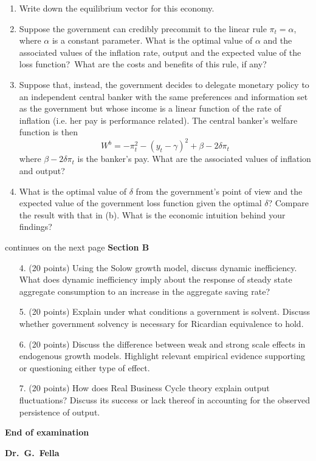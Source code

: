\documentclass[12pt,a4paper]{article}
\begin{document}
\begin{enumerate}
\begin{enumerate}
\item  Write down the equilibrium vector for this economy.
\item Suppose the government can credibly precommit to the linear rule $\pi
_{t}=\alpha $, where $\alpha $ is a constant parameter. What is the optimal
value of $\alpha $ and the associated values of the inflation rate, output
and the expected value of the loss function?\ What are the costs and
benefits of this rule, if any?

\item Suppose that, instead, the government decides to delegate
  monetary policy to an independent central banker with the same
  preferences and information set as the government but whose income
  is a linear function of the rate of inflation (i.e. her pay is
  performance related). The central banker's welfare function is then
\[
W^{b}=-\pi _{t}^{2}-(y_{t}-\gamma )^{2}+\beta-2\delta\pi _{t} 
\]
where $\beta-2\delta \pi _{t}$ is the banker's pay. What are the
associated values of inflation and output?

\item What is the optimal value of $\delta$ from the government's
  point of view and the expected value of the government loss function
  given the optimal $\delta$? Compare the result with that in (b).
  What is the economic intuition behind your findings?
\end{enumerate}
\end{enumerate}
\bigskip
\vfill \hfill continues on the next page\newpage
\textbf {Section B}
\begin{enumerate}
\item[4.] (20 points) Using the Solow growth model, discuss dynamic
  inefficiency. What does dynamic inefficiency imply about the response
  of steady state aggregate consumption to an increase in the aggregate
  saving rate?
\item [5.] (20 points) Explain under what conditions a government is
  solvent.  Discuss whether government solvency is necessary for
  Ricardian equivalence to hold.
\end{enumerate}
\begin{enumerate}
\item [6.] (20 points) Discuss the difference between weak and strong
  scale effects in endogenous growth models. Highlight relevant
  empirical evidence supporting or questioning either type of effect.
\item [7.] (20 points) How does Real Business Cycle theory explain
  output fluctuations? Discuss its success or lack thereof in accounting
  for the observed persistence of output.
\end{enumerate}


\hfill \textbf{End of examination}

\hfill \textbf{Dr.\ G.\ Fella}
\end{document}
